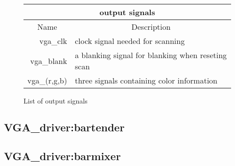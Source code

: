 \begin{figure}[h]
        \caption{List of output signals}
        \label{tab:outputs}
\begin{tabular}{|r|l|}     
        \hline
        \multicolumn{2}{|c|}{output signals}\\
        \hline
        \multicolumn{1}{|c}{Name} & \multicolumn{1}{c|}{Description} \\
        \hline
        vga\_clk & clock signal needed for scanning\\
        \cline{1-2}
        \hline
        vga\_blank & a blanking signal for blanking when reseting scan\\
        \cline{1-2}    
        \hline
        vga\_(r,g,b) & three signals containing color information\\
        \cline{1-2}    
        \hline
\end{tabular}
\end{figure}

  \subsection{VGA\_driver:bartender}
  \subsection{VGA\_driver:barmixer}

